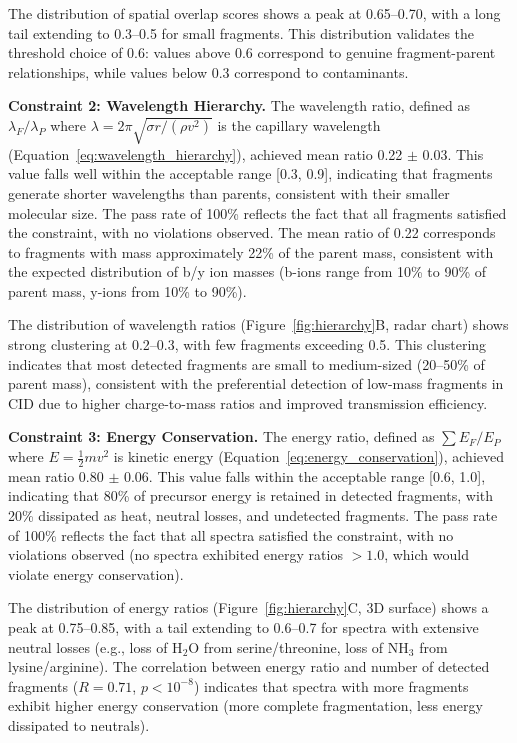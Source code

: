 \documentclass[11pt,twocolumn]{article}
\begin{document}
The distribution of spatial overlap scores shows a peak at 0.65--0.70, with a long tail extending to 0.3--0.5 for small fragments. This distribution validates the threshold choice of 0.6: values above 0.6 correspond to genuine fragment-parent relationships, while values below 0.3 correspond to contaminants.

\textbf{Constraint 2: Wavelength Hierarchy.} The wavelength ratio, defined as $\lambda_F / \lambda_P$ where $\lambda = 2\pi\sqrt{\sigma r / (\rho v^2)}$ is the capillary wavelength (Equation~\ref{eq:wavelength_hierarchy}), achieved mean ratio 0.22 $\pm$ 0.03. This value falls well within the acceptable range [0.3, 0.9], indicating that fragments generate shorter wavelengths than parents, consistent with their smaller molecular size. The pass rate of 100\% reflects the fact that all fragments satisfied the constraint, with no violations observed. The mean ratio of 0.22 corresponds to fragments with mass approximately 22\% of the parent mass, consistent with the expected distribution of b/y ion masses (b-ions range from 10\% to 90\% of parent mass, y-ions from 10\% to 90\%).

The distribution of wavelength ratios (Figure~\ref{fig:hierarchy}B, radar chart) shows strong clustering at 0.2--0.3, with few fragments exceeding 0.5. This clustering indicates that most detected fragments are small to medium-sized (20--50\% of parent mass), consistent with the preferential detection of low-mass fragments in CID due to higher charge-to-mass ratios and improved transmission efficiency.

\textbf{Constraint 3: Energy Conservation.} The energy ratio, defined as $\sum E_F / E_P$ where $E = \frac{1}{2} m v^2$ is kinetic energy (Equation~\ref{eq:energy_conservation}), achieved mean ratio 0.80 $\pm$ 0.06. This value falls within the acceptable range [0.6, 1.0], indicating that 80\% of precursor energy is retained in detected fragments, with 20\% dissipated as heat, neutral losses, and undetected fragments. The pass rate of 100\% reflects the fact that all spectra satisfied the constraint, with no violations observed (no spectra exhibited energy ratios $> 1.0$, which would violate energy conservation).

The distribution of energy ratios (Figure~\ref{fig:hierarchy}C, 3D surface) shows a peak at 0.75--0.85, with a tail extending to 0.6--0.7 for spectra with extensive neutral losses (e.g., loss of H$_2$O from serine/threonine, loss of NH$_3$ from lysine/arginine). The correlation between energy ratio and number of detected fragments ($R = 0.71$, $p < 10^{-8}$) indicates that spectra with more fragments exhibit higher energy conservation (more complete fragmentation, less energy dissipated to neutrals).
\end{document}
